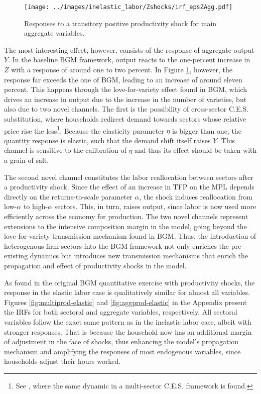 \documentclass[a4paper,12pt]{article} %
\numberwithin{equation}{section} %
\numberwithin{figure}{section}
\numberwithin{table}{section}
\begin{document}
\begin{figure}[H]
  \centering
  \texttt{[image: ../images/inelastic\_labor/Zshocks/irf\_epsZAgg.pdf]}
  \caption{Responses to a transitory positive productivity shock for main aggregate variables.}
  \label{fig:aggprod}
\end{figure}

The most interesting effect, however, consists of the response of aggregate
output $Y$. In the baseline BGM framework, output reacts to the one-percent increase in $Z$ with a response of 
around one to two percent. In Figure \ref{fig:aggprod}, however, the response far exceeds the one of BGM, leading to an increase of
around eleven percent. This happens through the love-for-variety effect found in BGM, which drives an increase
in output due to the increase in the number of varieties, but also due to two novel channels. The first is the possibility of cross-sector
C.E.S. substitution, where households redirect demand towards sectors whose relative price rise the less\footnote{See \textcite{gouel2023love}, 
where the same dynamic in a multi-sector C.E.S. framework is found.}. Because the elasticity parameter
$\eta$ is bigger than one, the quantity response is elastic, such that the demand shift itself raises $Y$. This channel is sensitive to
the calibration of $\eta$ and thus its effect should be taken with a grain of salt.

The second novel channel constitutes the labor reallocation between sectors after a productivity shock. Since the effect of an increase in
TFP on the MPL depends directly on the returns-to-scale parameter $\alpha$, the shock induces 
reallocation from low-$\alpha$ to high-$\alpha$ sectors. This, in turn, raises output, since labor is now used more efficiently across 
the economy for production. The two novel channels represent extensions to the intensive composition margin in the model, 
going beyond the love-for-variety transmission mechanism found in BGM. Thus, the introduction
of heterogenous firm sectors into the BGM framework not only enriches the pre-existing dynamics but introduces new transmission mechanisms
that enrich the propagation and effect of productivity shocks in the model.

As found in the original BGM quantitative exercise with productivity shocks, the response in the elastic labor case is 
qualitatively similar for almost all variables. Figures \ref{fig:multiprod-elastic} and \ref{fig:aggprod-elastic} in the Appendix present the IRFs for both
sectoral and aggregate variables, respectively. All sectoral variables follow the exact same pattern as in the inelastic labor case, albeit 
with stronger responses. That is because the household now has an additional margin of adjustment in the face of shocks, thus enhancing the model's 
propagation mechanism and amplifying the responses of most endogenous variables, since households adjust their hours worked. 
\end{document}
